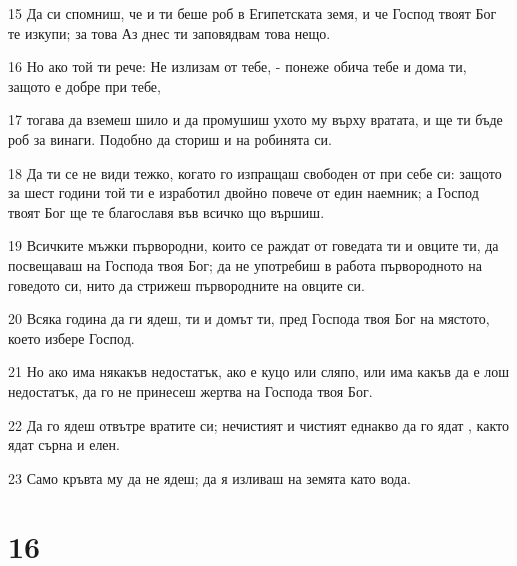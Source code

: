 \par 15 Да си спомниш, че и ти беше роб в Египетската земя, и че Господ твоят Бог те изкупи; за това Аз днес ти заповядвам това нещо.
\par 16 Но ако той ти рече: Не излизам от тебе, - понеже обича тебе и дома ти, защото е добре при тебе,
\par 17 тогава да вземеш шило и да промушиш ухото му върху вратата, и ще ти бъде роб за винаги. Подобно да сториш и на робинята си.
\par 18 Да ти се не види тежко, когато го изпращаш свободен от при себе си: защото за шест години той ти е изработил двойно повече от един наемник; а Господ твоят Бог ще те благославя във всичко що вършиш.
\par 19 Всичките мъжки първородни, които се раждат от говедата ти и овците ти, да посвещаваш на Господа твоя Бог; да не употребиш в работа първородното на говедото си, нито да стрижеш първородните на овците си.
\par 20 Всяка година да ги ядеш, ти и домът ти, пред Господа твоя Бог на мястото, което избере Господ.
\par 21 Но ако има някакъв недостатък, ако е куцо или сляпо, или има какъв да е лош недостатък, да го не принесеш жертва на Господа твоя Бог.
\par 22 Да го ядеш отвътре вратите си; нечистият и чистият еднакво да го ядат , както ядат сърна и елен.
\par 23 Само кръвта му да не ядеш; да я изливаш на земята като вода.

\chapter{16}

